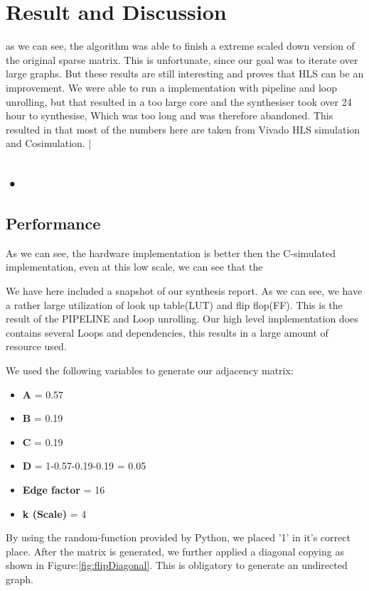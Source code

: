 \chapter{Result and Discussion} \label{result}

as we can see, the algorithm was able to finish a extreme scaled down version of the original sparse matrix. This is unfortunate, since our goal was to iterate over large graphs. But these results are still interesting and proves that HLS can be an improvement.
We were able to run a implementation with pipeline and loop unrolling, but that resulted in a too large core and the synthesiser took over 24 hour to synthesise, Which was too long and was therefore abandoned.
This resulted in that most of the numbers here are taken from Vivado HLS simulation and Cosimulation. |

\section{•}

\section{Performance}
As we can see, the hardware implementation is better then the C-simulated implementation, even at this low scale, we can see that the

We have here included a snapshot of our synthesis report. As we can see, we have a rather large utilization of look up table(LUT) and flip flop(FF). This is the result of the PIPELINE and Loop unrolling. Our high level implementation does contains several Loops and dependencies, this results in a large amount of resource used. 

We used the following variables to generate our adjacency matrix:
\begin{itemize}
\item \textbf{A} = 0.57
\item \textbf{B} = 0.19
\item \textbf{C} = 0.19
\item \textbf{D} = 1-0.57-0.19-0.19 = 0.05
\item \textbf{Edge factor}  = 16
\item \textbf{k (Scale)} = 4
\end{itemize}

By using the random-function provided by Python, we placed '1' in it's correct place. After the matrix is generated, we further applied a diagonal copying as shown in Figure:\ref{fig:flipDiagonal}. This is obligatory to generate an undirected graph.


